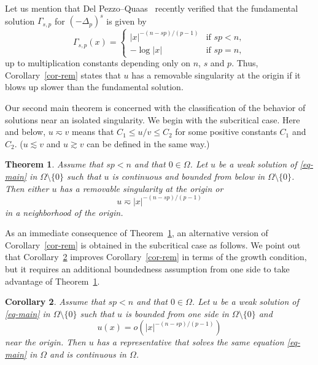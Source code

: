 \documentclass[11pt]{amsart}
\theoremstyle{plain}
\newtheorem{theorem}{Theorem}[section]
\newtheorem{corollary}[theorem]{Corollary}
\theoremstyle{definition}
\numberwithin{equation}{section}
\begin{document}
Let us mention that Del Pezzo--Quaas~\cite{DPQ23} recently verified that the fundamental solution $\Gamma_{s, p}$ for $(-\Delta_p)^s$ is given by 
	\begin{equation*}
		\Gamma_{s, p}(x)=
		\begin{cases}
			|x|^{-(n-sp)/(p-1)} & \text{if $sp<n$},\\
			-\log|x| & \text{if $sp=n$},
		\end{cases}
	\end{equation*}
up to multiplication constants depending only on $n$, $s$ and $p$. Thus, Corollary~\ref{cor-rem} states that $u$ has a removable singularity at the origin if it blows up slower than the fundamental solution. 

Our second main theorem is concerned with the classification of the behavior of solutions near an isolated singularity. We begin with the subcritical case. Here and below, $u \eqsim v$ means that $C_1 \leq u/v \leq C_2$ for some positive constants $C_1$ and $C_2$. ($u \lesssim v$ and $u \gtrsim v$ can be defined in the same way.)
	\begin{theorem}\label{thm-iso-sub}
		Assume that $sp<n$ and that $0 \in \Omega$. Let $u$ be a weak solution of \eqref{eq-main} in $\Omega \setminus \{0\}$ such that $u$ is continuous and bounded from below in $\Omega \setminus \{0\}$. Then either $u$ has a removable singularity at the origin or
		\begin{equation*}
			u \eqsim |x|^{-(n-sp)/(p-1)}
		\end{equation*}
		in a neighborhood of the origin.
	\end{theorem}
	
	
	As an immediate consequence of Theorem~\ref{thm-iso-sub}, an alternative version of Corollary~\ref{cor-rem} is obtained in the subcritical case as follows. We point out that Corollary~\ref{cor-rem2} improves Corollary~\ref{cor-rem} in terms of the growth condition, but it requires an additional boundedness assumption from one side to take advantage of Theorem~\ref{thm-iso-sub}.

\begin{corollary}\label{cor-rem2}
Assume that $sp<n$ and that $0 \in \Omega$. Let $u$ be a weak solution of \eqref{eq-main} in $\Omega \setminus \{0\}$ such that $u$ is bounded from one side in $\Omega \setminus \{0\}$ and
	\begin{equation*}
		u(x)=o\left(|x|^{-(n-sp)/(p-1)} \right)
	\end{equation*}
	near the origin. Then $u$ has a representative that solves the same equation \eqref{eq-main} in $\Omega$ and is continuous in $\Omega$.
\end{corollary}
\end{document}
